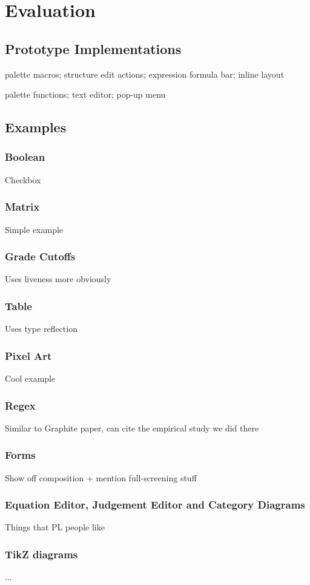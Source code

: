 \section{Evaluation}

\subsection{Prototype Implementations}

\parahead{\Hazel{}}

palette macros; structure edit actions; expression formula bar; inline layout

\parahead{\sns{}}

palette functions; text editor; pop-up menu

\subsection{Examples}


\subsubsection{Boolean}
Checkbox

\subsubsection{Matrix}
Simple example

\subsubsection{Grade Cutoffs}
Uses liveness more obviously

\subsubsection{Table}
Uses type reflection

\subsubsection{Pixel Art}
Cool example

\subsubsection{Regex}
Similar to Graphite paper, can cite the empirical study we did there

\subsubsection{Forms}
Show off composition + mention full-screening stuff

\subsubsection{Equation Editor, Judgement Editor and Category Diagrams}
Things that PL people like 

\subsubsection{TikZ diagrams}
...

